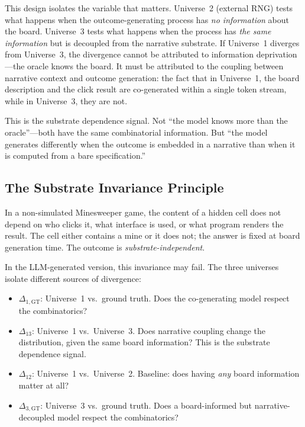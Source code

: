 \documentclass[12pt,a4paper]{article}
\begin{document}
This design isolates the variable that matters. Universe~2 (external RNG) tests what happens when the outcome-generating process has \emph{no information} about the board. Universe~3 tests what happens when the process has \emph{the same information} but is decoupled from the narrative substrate. If Universe~1 diverges from Universe~3, the divergence cannot be attributed to information deprivation---the oracle knows the board. It must be attributed to the coupling between narrative context and outcome generation: the fact that in Universe~1, the board description and the click result are co-generated within a single token stream, while in Universe~3, they are not.

This is the substrate dependence signal. Not ``the model knows more than the oracle''---both have the same combinatorial information. But ``the model generates differently when the outcome is embedded in a narrative than when it is computed from a bare specification.''\

\subsection{The Substrate Invariance Principle}
\label{sec:invariance}

In a non-simulated Minesweeper game, the content of a hidden cell does not depend on who clicks it, what interface is used, or what program renders the result. The cell either contains a mine or it does not; the answer is fixed at board generation time. The outcome is \emph{substrate-independent}.

In the LLM-generated version, this invariance may fail. The three universes isolate different sources of divergence:

\begin{itemize}[nosep]
    \item $\Delta_{1,\text{GT}}$: Universe~1 vs.\ ground truth. Does the co-generating model respect the combinatorics?
    \item $\Delta_{13}$: Universe~1 vs.\ Universe~3. Does narrative coupling change the distribution, given the same board information? This is the substrate dependence signal.
    \item $\Delta_{12}$: Universe~1 vs.\ Universe~2. Baseline: does having \emph{any} board information matter at all?
    \item $\Delta_{3,\text{GT}}$: Universe~3 vs.\ ground truth. Does a board-informed but narrative-decoupled model respect the combinatorics?
\end{itemize}
\end{document}
